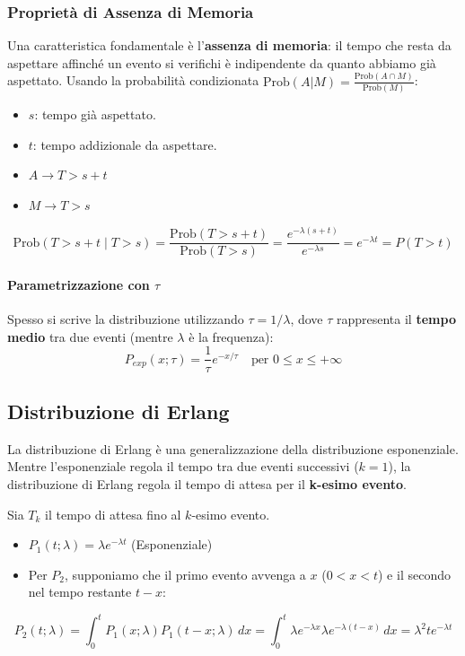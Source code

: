 \documentclass[openany,a4paper,12pt]{book}
\theoremstyle{remark}
\begin{document}
\subsubsection*{Proprietà di Assenza di Memoria}
Una caratteristica fondamentale è l'\textbf{assenza di memoria}: il tempo che resta da aspettare affinché un evento si verifichi è indipendente da quanto abbiamo già aspettato.
Usando la probabilità condizionata $\text{Prob}(A|M) = \frac{\text{Prob}(A \cap M)}{\text{Prob}(M)}$:
\begin{itemize}
    \item $s$: tempo già aspettato.
    \item $t$: tempo addizionale da aspettare.
    \item $A \rightarrow T > s + t$
    \item $M \rightarrow T > s$
\end{itemize}
\begin{equation}
    \text{Prob}(T > s+t \mid T > s) = \frac{\text{Prob}(T > s+t)}{\text{Prob}(T > s)} = \frac{e^{-\lambda(s+t)}}{e^{-\lambda s}} = e^{-\lambda t} = P(T > t)
\end{equation}

\paragraph{Parametrizzazione con $\tau$}
Spesso si scrive la distribuzione utilizzando $\tau = 1/\lambda$, dove $\tau$ rappresenta il \textbf{tempo medio} tra due eventi (mentre $\lambda$ è la frequenza):
\begin{equation}
    P_{exp}(x; \tau) = \frac{1}{\tau} e^{-x/\tau} \quad \text{per } 0 \le x \le +\infty
\end{equation}



\subsection{Distribuzione di Erlang}
La distribuzione di Erlang è una generalizzazione della distribuzione esponenziale. Mentre l'esponenziale regola il tempo tra due eventi successivi ($k=1$), la distribuzione di Erlang regola il tempo di attesa per il \textbf{k-esimo evento}.



Sia $T_k$ il tempo di attesa fino al $k$-esimo evento.
\begin{itemize}
    \item $P_1(t; \lambda) = \lambda e^{-\lambda t}$ (Esponenziale)
    \item Per $P_2$, supponiamo che il primo evento avvenga a $x$ ($0 < x < t$) e il secondo nel tempo restante $t-x$:
\end{itemize}
\begin{equation}
    P_2(t; \lambda) = \int_0^t P_1(x; \lambda) P_1(t-x; \lambda) \, dx = \int_0^t \lambda e^{-\lambda x} \lambda e^{-\lambda(t-x)} \, dx = \lambda^2 t e^{-\lambda t}
\end{equation}
\end{document}
